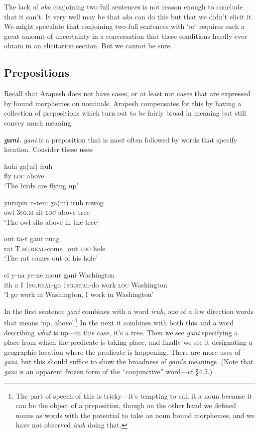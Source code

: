 \documentclass[pdftex,12pt,letterpaper]{article}
\let\ipa\textipa
\begin{document}
The lack of \emph{aka} conjoining two full sentences is not reason enough to conclude that it can't. It very well may be that \emph{aka} can do this but that we didn't elicit it. We might speculate that conjoining two full sentences with `or' requires such a great amount of uncertainty in a conversation that these conditions hardly ever obtain in an elicitation section. But we cannot be sure.

\subsection{Prepositions}

Recall that Arapesh does not have cases, or at least not cases that are expressed by bound morphemes on nominals. Arapesh compensates for this by having a collection of prepositions which turn out to be fairly broad in meaning but still convey much meaning. 

\textbf{\emph{gani.}} \emph{gani} is a preposition that is most often followed by words that specify location. Consider these uses:

\begin{exe}
\ex\gll hohi\ipa{b1k} ga(ni) iruh \\
fly \textsc{loc} above \\
\trans `The birds are flying up'

\ex\gll yurupin n\ipa{@}-tem ga(ni) iruh rowog \\
owl \textsc{3sg.m}-sit \textsc{loc} above tree \\
\trans `The owl sits above in the tree'

\ex\gll out ta-t\ipa{@g@r@ri} gani nuag \\
rat \textsc{T.sg.real}-come\_out \textsc{loc} hole \\
\trans `The rat comes out of his hole'

\ex\gll ei y\ipa{@}-na ye-ne mour gani Washington \\
ith a I \textsc{1sg.real}-go \textsc{1sg.real}-do work \textsc{loc} Washington \\
\trans `I go work in Washington, I work in Washington'
\end{exe}

\noindent In the first sentence \emph{gani} combines with a word \emph{iruh}, one of a few direction words that means `up, above'.\footnote{The part of speech of this is tricky---it's tempting to call it a noun because it can be the object of a preposition, though on the other hand we defined nouns as words with the potential to take on noun bound morphemes, and we have not observed \emph{iruh} doing that.} In the next it combines with both this and a word describing \emph{what} is up---in this case, it's a tree. Then we see \emph{gani} specifying a place from which the predicate is taking place, and finally we see it designating a geographic location where the predicate is happening. There are more uses of \emph{gani}, but this should suffice to show the broadness of \emph{gani}'s meanings. (Note that \emph{gani} is an apparent frozen form of the ``conjunctive'' word---cf \S 4.5.)
\end{document}
